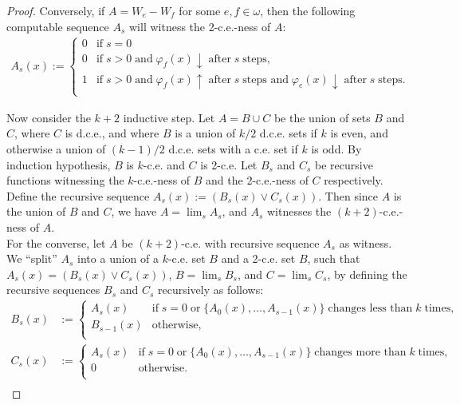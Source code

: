 \documentclass{article}
\begin{document}
\begin{enumerate}[label={\bf Q\arabic*:}]
\begin{proof}
      Conversely, if $A=W_e-W_f$ for some $e,f\in\omega$, then the
      following computable sequence $A_s$ will witness the 2-c.e.-ness of
      $A$:
      \begin{align*}
        A_s(x) :=
        \begin{cases}
          0 &\text{if}\; s=0\\
          0 &\text{if}\; s>0\; \text{and}\; \varphi_f(x)\downarrow\;
            \text{after}\; s\; \text{steps},\\
          1 &\text{if}\; s>0\; \text{and}\; \varphi_f(x)\uparrow\;
            \text{after}\; s\; \text{steps and}\; \varphi_e(x)\downarrow\;
            \text{after}\; s\; \text{steps}.\\
        \end{cases}
      \end{align*}

      Now consider the $k+2$ inductive step. Let $A=B\cup C$ be the union
      of sets $B$ and $C$, where $C$ is d.c.e., and where $B$ is a union of
      $k/2$ d.c.e. sets if $k$ is even, and otherwise a union of $(k-1)/2$
      d.c.e. sets with a c.e. set if $k$ is odd. By induction hypothesis,
      $B$ is $k$-c.e. and $C$ is 2-c.e. Let $B_s$ and $C_s$ be recursive
      functions witnessing the $k$-c.e.-ness of $B$ and the 2-c.e.-ness of
      $C$ respectively. Define the recursive sequence $A_s(x) :=(B_s(x)\vee
      C_s(x))$. Then since $A$ is the union of $B$ and $C$, we have
      $A=\lim_s A_s$, and $A_s$ witnesses the $(k+2)$-c.e.-ness of $A$. \\

      For the converse, let $A$ be $(k+2)$-c.e. with recursive sequence
      $A_s$ as witness. We ``split'' $A_s$ into a union of a $k$-c.e.
      set $B$ and a 2-c.e. set $B$, such that $A_s(x)=(B_s(x)\vee C_s(x))$,
      $B=\lim_sB_s$, and $C=\lim_sC_s$, by defining the recursive sequences
      $B_s$ and $C_s$ recursively as follows:
      \begin{align*}
        B_s(x) &:=
        \begin{cases}
          A_s(x) &\text{if}\; s=0\; \text{or}\;
            \{A_0(x),\ldots,A_{s-1}(x)\}\; \text{changes less than}\; k\;
            \text{times},\\
          B_{s-1}(x) &\text{otherwise},\\
        \end{cases}\\
        C_s(x) &:=
        \begin{cases}
          A_s(x) &\text{if}\; s=0\; \text{or}\;
            \{A_0(x),\ldots,A_{s-1}(x)\}\; \text{changes more than}\; k\;
            \text{times},\\
          0 &\text{otherwise}.\\
        \end{cases}\\
      \end{align*}


\end{proof}
\end{enumerate}
\end{document}
